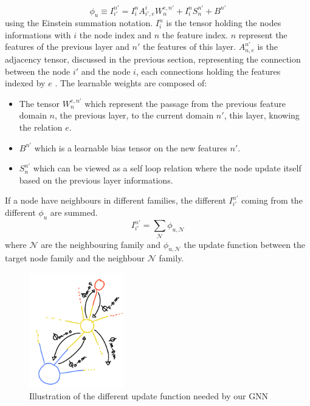 \documentclass[../main.tex]{subfiles}
\begin{document}
\begin{equation}
  \phi_u \equiv I^{n'}_{i'} = I^n_i A_{i',e}^{i} W_n^{e,n'} + I^n_i S^{n'}_{n} + B^{n'}
\end{equation}
using the Einstein summation notation. $I^{n}_i$ is the tensor holding the nodes informations with $i$ the node index and $n$ the feature index. $n$ represent the features of the previous layer and $n'$ the features of this layer. $A_{n,e}^{n'}$ is the adjacency tensor, discussed in the previous section, representing the connection between the node $i'$ and the node $i$, each connections holding the features indexed by $e$ . The learnable weights are composed of:
\begin{itemize}
  \item The tensor $W_n^{e,n'}$ which represent the passage from the previous feature domain $n$, the previous layer, to the current domain $n'$, this layer, knowing the relation $e$.
  \item $B^{n'}$ which is a learnable bias tensor on the new features $n'$.
  \item $S^{n'}_n$ which can be viewed as a self loop relation where the node update itself based on the previous layer informations.
\end{itemize}
If a node have neighbours in different families, the different $I^{n'}_{i'}$ coming from the different $\phi_u$ are summed.
\begin{equation}
  I^{n'}_{i'} = \sum_\mathcal{N} \phi_{u,\mathcal{N}}
\end{equation}
where $\mathcal{N}$ are the neighbouring family and $\phi_{u,\mathcal{N}}$ the update function between the target node family and the neighbour $\mathcal{N}$ family.

\begin{figure}
  \centering
  \includegraphics[height=5cm]{images/jgnn/mp_illus.png}
  \caption{Illustration of the different update function needed by our GNN}
  \label{fig:jgnn:mp_ill}
\end{figure}
\end{document}
